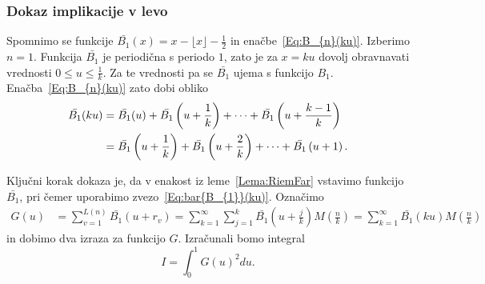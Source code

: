 \documentclass[mat1]{fmfdelo}
\begin{document}
\subsubsection{Dokaz implikacije v levo}
Spomnimo se funkcije $ \bar{B_{1}}(x) = x - \lfloor x \rfloor - \frac{1}{2} $ in enačbe~\eqref{Eq:B_{n}(ku)}. Izberimo $n=1$. Funkcija $\bar{B_{1}}$ je periodična s periodo $1$, zato je za $x=ku$ dovolj obravnavati vrednosti $0 \leq u \leq \frac{1}{k}$. Za te vrednosti pa se $\bar{B_{1}}$ ujema s funkcijo $B_{1}$. Enačba~\eqref{Eq:B_{n}(ku)} zato dobi obliko
\begin{align}
\label{Eq:bar{B_{1}}(ku)}
\bar{B_{1}}(ku) &= \bar{B_{1}}(u) + \bar{B_{1}} \left( u + \frac{1}{k} \right) + \dots + \bar{B_{1}} \left( u + \frac{k-1}{k} \right) \nonumber \\
			&= \bar{B_{1}} \left( u + \frac{1}{k} \right) + \bar{B_{1}} \left( u + \frac{2}{k} \right) + \dots + \bar{B_{1}} \left( u + 1 \right).
\end{align}

Ključni korak dokaza je, da v enakost iz leme~\ref{Lema:RiemFar} vstavimo funkcijo $ \bar{B_{1}}$, pri čemer uporabimo zvezo~\eqref{Eq:bar{B_{1}}(ku)}. Označimo
\begin{align}
G(u) &= \sum_{v=1}^{L(n)} \bar{B_{1}}(u+r_v) = \sum_{k=1}^{\infty} \sum_{j=1}^{k} \bar{B_{1}} \left(u + \frac{j}{k} \right) M \left(\frac{n}{k} \right)
	= \sum_{k=1}^{\infty} \bar{B_{1}}(ku) M \left(\frac{n}{k} \right)
\end{align}
in dobimo dva izraza za funkcijo $G$. Izračunali bomo integral 
\begin{equation}
I = \int_{0}^1 G(u)^2 du.
\end{equation}
\end{document}
